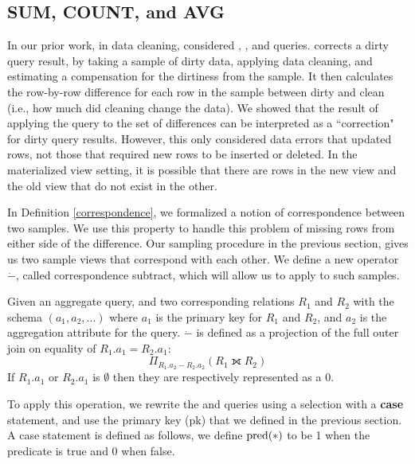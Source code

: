 \subsection{SUM, COUNT, and AVG}
In our prior work, in data cleaning, \nsc considered \sumfunc, \countfunc, and \avgfunc queries.
\nsc corrects a dirty query result, by taking a sample of dirty data, applying data cleaning, and estimating a compensation for the dirtiness from the sample.
It then calculates the row-by-row difference for each row in the sample between dirty and clean (i.e., how much did cleaning change the data).
We showed that the result of applying the query to the set of differences can be interpreted as a ``correction" for dirty query results. 
However, this only considered data errors that updated rows, not those that required new rows to be inserted or deleted.
In the materialized view setting, it is possible that there are rows in the new view and the old view that do not exist in the other.

In Definition \ref{correspondence}, we formalized a notion of correspondence between two samples.
We use this property to handle this problem of missing rows from either side of the difference.
Our sampling procedure in the previous section, gives us two sample views that correspond with each other.
We define a new operator $\dot{-}$, called correspondence subtract, which will allow us to apply \nsc to such samples.
\begin{definition} Given an aggregate query, and two corresponding relations $R_1$ and $R_2$ with the schema $(a_1, a_2, ...)$ where $a_1$ is the primary key for $R_1$ and $R_2$, and $a_2$ is the aggregation attribute for the query. 
$\dot{-}$ is defined as a projection of the full outer join on equality of $R_1.a_1 = R_2.a_1$: \[ \Pi_{R_1.a_2 - R_2.a_2} ( R_1 \fullouterjoin R_2 ) \]
If $R_1.a_1$ or $R_2.a_1$ is $\emptyset$ then they are respectively represented as a $0$.
\end{definition}
To apply this operation, we rewrite the \sumfunc and \countfunc queries using a selection with a \textbf{case} statement, and use the primary key (pk) that we defined in the previous section.
A case statement is defined as follows, we define $\textrm{pred}(*)$ to be 1 when the predicate is true and 0 when false.

